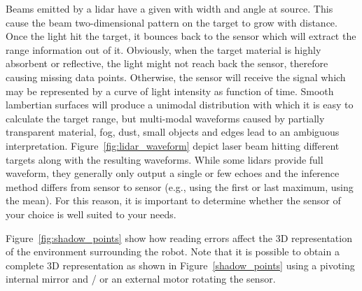 Beams emitted by a \gls*{lidar} have a given with width and angle at source. This cause the beam two-dimensional pattern on the target to grow with distance. Once the light hit the target, it bounces back to the sensor which will extract the range information out of it. Obviously, when the target material is highly absorbent or reflective, the light might not reach back the sensor, therefore causing missing data points. Otherwise, the sensor will receive the signal which may be represented by a curve of light intensity as function of time. Smooth lambertian surfaces will produce a unimodal distribution with which it is easy to calculate the target range, but multi-modal waveforms caused by partially transparent material, fog, dust, small objects and edges lead to an ambiguous interpretation. Figure~\ref{fig:lidar_waveform} depict laser beam hitting different targets along with the resulting waveforms. While some \gls*{lidar}s provide full waveform, they generally only output a single or few echoes and the inference method differs from sensor to sensor (e.g., using the first or last maximum, using the mean). For this reason, it is important to determine whether the sensor of your choice is well suited to your needs. 

Figure~\ref{fig:shadow_points} show how reading errors affect the 3D representation of the environment surrounding the robot.  Note that it is possible to obtain a complete 3D representation as shown in Figure~\ref{shadow_points} using a pivoting internal mirror and / or an external motor rotating the sensor. 

